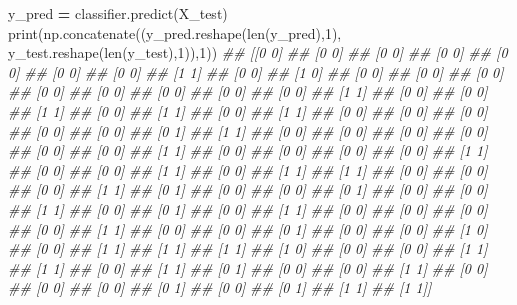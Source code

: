 \documentclass[
]{book}
\newenvironment{Shaded}{\begin{snugshade}}{\end{snugshade}}
\newcommand{\BuiltInTok}[1]{#1}
\newcommand{\CommentTok}[1]{\textcolor[rgb]{0.56,0.35,0.01}{\textit{#1}}}
\newcommand{\DecValTok}[1]{\textcolor[rgb]{0.00,0.00,0.81}{#1}}
\newcommand{\NormalTok}[1]{#1}
\newcommand{\OperatorTok}[1]{\textcolor[rgb]{0.81,0.36,0.00}{\textbf{#1}}}
\theoremstyle{definition}
\theoremstyle{definition}
\theoremstyle{definition}
\theoremstyle{definition}
\theoremstyle{remark}
\begin{document}
\begin{Shaded}
\begin{Highlighting}[]
\NormalTok{y\_pred }\OperatorTok{=}\NormalTok{ classifier.predict(X\_test)}
\BuiltInTok{print}\NormalTok{(np.concatenate((y\_pred.reshape(}\BuiltInTok{len}\NormalTok{(y\_pred),}\DecValTok{1}\NormalTok{), y\_test.reshape(}\BuiltInTok{len}\NormalTok{(y\_test),}\DecValTok{1}\NormalTok{)),}\DecValTok{1}\NormalTok{))}
\CommentTok{\#\# [[0 0]}
\CommentTok{\#\#  [0 0]}
\CommentTok{\#\#  [0 0]}
\CommentTok{\#\#  [0 0]}
\CommentTok{\#\#  [0 0]}
\CommentTok{\#\#  [0 0]}
\CommentTok{\#\#  [0 0]}
\CommentTok{\#\#  [1 1]}
\CommentTok{\#\#  [0 0]}
\CommentTok{\#\#  [1 0]}
\CommentTok{\#\#  [0 0]}
\CommentTok{\#\#  [0 0]}
\CommentTok{\#\#  [0 0]}
\CommentTok{\#\#  [0 0]}
\CommentTok{\#\#  [0 0]}
\CommentTok{\#\#  [0 0]}
\CommentTok{\#\#  [0 0]}
\CommentTok{\#\#  [0 0]}
\CommentTok{\#\#  [1 1]}
\CommentTok{\#\#  [0 0]}
\CommentTok{\#\#  [0 0]}
\CommentTok{\#\#  [1 1]}
\CommentTok{\#\#  [0 0]}
\CommentTok{\#\#  [1 1]}
\CommentTok{\#\#  [0 0]}
\CommentTok{\#\#  [1 1]}
\CommentTok{\#\#  [0 0]}
\CommentTok{\#\#  [0 0]}
\CommentTok{\#\#  [0 0]}
\CommentTok{\#\#  [0 0]}
\CommentTok{\#\#  [0 0]}
\CommentTok{\#\#  [0 1]}
\CommentTok{\#\#  [1 1]}
\CommentTok{\#\#  [0 0]}
\CommentTok{\#\#  [0 0]}
\CommentTok{\#\#  [0 0]}
\CommentTok{\#\#  [0 0]}
\CommentTok{\#\#  [0 0]}
\CommentTok{\#\#  [0 0]}
\CommentTok{\#\#  [1 1]}
\CommentTok{\#\#  [0 0]}
\CommentTok{\#\#  [0 0]}
\CommentTok{\#\#  [0 0]}
\CommentTok{\#\#  [0 0]}
\CommentTok{\#\#  [1 1]}
\CommentTok{\#\#  [0 0]}
\CommentTok{\#\#  [0 0]}
\CommentTok{\#\#  [1 1]}
\CommentTok{\#\#  [0 0]}
\CommentTok{\#\#  [1 1]}
\CommentTok{\#\#  [1 1]}
\CommentTok{\#\#  [0 0]}
\CommentTok{\#\#  [0 0]}
\CommentTok{\#\#  [0 0]}
\CommentTok{\#\#  [1 1]}
\CommentTok{\#\#  [0 1]}
\CommentTok{\#\#  [0 0]}
\CommentTok{\#\#  [0 0]}
\CommentTok{\#\#  [0 1]}
\CommentTok{\#\#  [0 0]}
\CommentTok{\#\#  [0 0]}
\CommentTok{\#\#  [1 1]}
\CommentTok{\#\#  [0 0]}
\CommentTok{\#\#  [0 1]}
\CommentTok{\#\#  [0 0]}
\CommentTok{\#\#  [1 1]}
\CommentTok{\#\#  [0 0]}
\CommentTok{\#\#  [0 0]}
\CommentTok{\#\#  [0 0]}
\CommentTok{\#\#  [0 0]}
\CommentTok{\#\#  [1 1]}
\CommentTok{\#\#  [0 0]}
\CommentTok{\#\#  [0 0]}
\CommentTok{\#\#  [0 1]}
\CommentTok{\#\#  [0 0]}
\CommentTok{\#\#  [0 0]}
\CommentTok{\#\#  [1 0]}
\CommentTok{\#\#  [0 0]}
\CommentTok{\#\#  [1 1]}
\CommentTok{\#\#  [1 1]}
\CommentTok{\#\#  [1 1]}
\CommentTok{\#\#  [1 0]}
\CommentTok{\#\#  [0 0]}
\CommentTok{\#\#  [0 0]}
\CommentTok{\#\#  [1 1]}
\CommentTok{\#\#  [1 1]}
\CommentTok{\#\#  [0 0]}
\CommentTok{\#\#  [1 1]}
\CommentTok{\#\#  [0 1]}
\CommentTok{\#\#  [0 0]}
\CommentTok{\#\#  [0 0]}
\CommentTok{\#\#  [1 1]}
\CommentTok{\#\#  [0 0]}
\CommentTok{\#\#  [0 0]}
\CommentTok{\#\#  [0 0]}
\CommentTok{\#\#  [0 1]}
\CommentTok{\#\#  [0 0]}
\CommentTok{\#\#  [0 1]}
\CommentTok{\#\#  [1 1]}
\CommentTok{\#\#  [1 1]]}
\end{Highlighting}
\end{Shaded}
\end{document}
